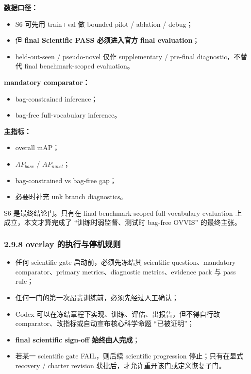 \documentclass[UTF8]{ctexart}
\begin{document}
\textbf{数据口径：}
\begin{itemize}
\item S6 可先用 train+val 做 bounded pilot / ablation / debug；
\item 但 \textbf{final Scientific PASS 必须进入官方 final evaluation}；
\item held-out-seen / pseudo-novel 仅作 supplementary / pre-final diagnostic，不替代 final benchmark-scoped evaluation。
\end{itemize}

\textbf{mandatory comparator：}
\begin{itemize}
\item bag-constrained inference；
\item bag-free full-vocabulary inference。
\end{itemize}

\textbf{主指标：}
\begin{itemize}
\item overall mAP；
\item $AP_{base}$ / $AP_{novel}$；
\item bag-constrained vs bag-free gap；
\item 必要时补充 unk branch diagnostics。
\end{itemize}
S6 是最终结论门。只有在 final benchmark-scoped full-vocabulary evaluation 上成立，本文才算完成了 ``训练时弱监督、测试时 bag-free OVVIS'' 的最终主张。

\subsubsection*{2.9.8 overlay 的执行与停机规则}
\begin{itemize}
\item 任何 scientific gate 启动前，必须先冻结其 scientific question、mandatory comparator、primary metrics、diagnostic metrics、evidence pack 与 pass rule；
\item 任何一门的第一次昂贵训练前，必须先经过人工确认；
\item Codex 可以在冻结章程下实现、训练、评估、出报告，但不得自行改 comparator、改指标或自动宣布核心科学命题 ``已被证明''；
\item \textbf{final scientific sign-off 始终由人完成}；
\item 若某一 scientific gate FAIL，则后续 scientific progression 停止；只有在显式 recovery / charter revision 获批后，才允许重开该门或定义恢复子门。
\end{itemize}
\end{document}
